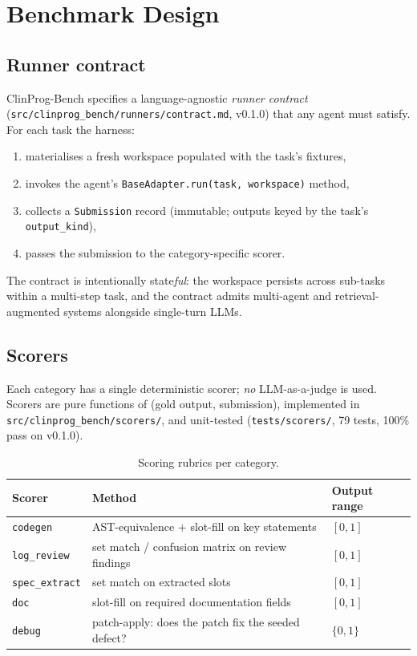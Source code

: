 \section{Benchmark Design}
\label{sec:benchmark}

\subsection{Runner contract}

ClinProg-Bench specifies a language-agnostic \emph{runner contract}
(\texttt{src/clinprog\_bench/runners/contract.md}, v0.1.0) that any agent
must satisfy. For each task the harness:
%
\begin{enumerate}
  \item materialises a fresh workspace populated with the task's fixtures,
  \item invokes the agent's \texttt{BaseAdapter.run(task, workspace)} method,
  \item collects a \texttt{Submission} record (immutable; outputs keyed by
        the task's \texttt{output\_kind}),
  \item passes the submission to the category-specific scorer.
\end{enumerate}
%
The contract is intentionally state\emph{ful}: the workspace persists across
sub-tasks within a multi-step task, and the contract admits multi-agent and
retrieval-augmented systems alongside single-turn LLMs.

\subsection{Scorers}

Each category has a single deterministic scorer; \emph{no} LLM-as-a-judge is
used. Scorers are pure functions of (gold output, submission), implemented
in \texttt{src/clinprog\_bench/scorers/}, and unit-tested
(\texttt{tests/scorers/}, 79 tests, 100\% pass on v0.1.0).

\begin{table}[h]
\centering
\small
\caption{Scoring rubrics per category.}
\label{tab:scorers}
\begin{tabular}{lll}
\toprule
Scorer & Method & Output range \\
\midrule
\texttt{codegen}      & AST-equivalence + slot-fill on key statements      & $[0, 1]$ \\
\texttt{log\_review}  & set match / confusion matrix on review findings    & $[0, 1]$ \\
\texttt{spec\_extract}& set match on extracted slots                       & $[0, 1]$ \\
\texttt{doc}          & slot-fill on required documentation fields         & $[0, 1]$ \\
\texttt{debug}        & patch-apply: does the patch fix the seeded defect? & $\{0, 1\}$ \\
\bottomrule
\end{tabular}
\end{table}

